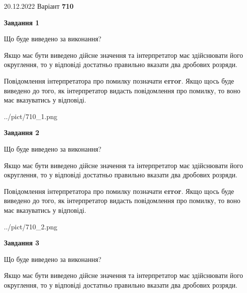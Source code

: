 \documentclass[12pt, ukrainian]{article}
\begin{document}
{20.12.2022 Варіант \No \textbf { 710 }\par}
{
\begin {Large}

{\begin {center}\textbf{Завдання 1}\end {center}}\par
Що буде виведено за виконання? \par

Якщо має бути виведено дійсне значення та інтерпретатор має здійснювати його округлення, 
то у відповіді достатньо правильно вказати два дробових розряди.

Повідомлення інтерпретатора про помилку позначати \textbf{error}.
Якщо щось буде виведено до того, як інтерпретатор видасть повідомлення про помилку, 
то воно має вказуватись у відповіді. \par

\begin{center}
	{../pict/710_1.png}
\end{center}
\newpage

{\begin {center}\textbf{Завдання 2}\end {center}}\par
Що буде виведено за виконання? \par

Якщо має бути виведено дійсне значення та інтерпретатор має здійснювати його округлення, 
то у відповіді достатньо правильно вказати два дробових розряди.

Повідомлення інтерпретатора про помилку позначати \textbf{error}.
Якщо щось буде виведено до того, як інтерпретатор видасть повідомлення про помилку, 
то воно має вказуватись у відповіді. \par

\begin{center}
	{../pict/710_2.png}
\end{center}
\newpage

{\begin {center}\textbf{Завдання 3}\end {center}}\par
Що буде виведено за виконання? \par

Якщо має бути виведено дійсне значення та інтерпретатор має здійснювати його округлення, 
то у відповіді достатньо правильно вказати два дробових розряди.


\end{Large}}
\end{document}
